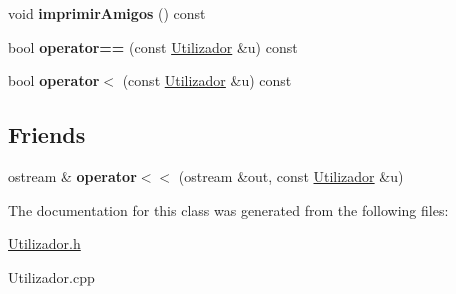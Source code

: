 \begin{DoxyCompactItemize}
\item 
\hypertarget{class_utilizador_a433c888d3d5d669cda5fcb8d22832b37}{}void {\bfseries imprimir\+Amigos} () const \label{class_utilizador_a433c888d3d5d669cda5fcb8d22832b37}

\item 
\hypertarget{class_utilizador_a051ebe3fbeadbb5b00a78da320a9f49e}{}bool {\bfseries operator==} (const \hyperlink{class_utilizador}{Utilizador} \&u) const \label{class_utilizador_a051ebe3fbeadbb5b00a78da320a9f49e}

\item 
\hypertarget{class_utilizador_a19b6202cece0cde531de23a1fd24b4c6}{}bool {\bfseries operator$<$} (const \hyperlink{class_utilizador}{Utilizador} \&u) const \label{class_utilizador_a19b6202cece0cde531de23a1fd24b4c6}

\end{DoxyCompactItemize}
\subsection*{Friends}
\begin{DoxyCompactItemize}
\item 
\hypertarget{class_utilizador_ad02a468bf3828d06a96b41947147c754}{}ostream \& {\bfseries operator$<$$<$} (ostream \&out, const \hyperlink{class_utilizador}{Utilizador} \&u)\label{class_utilizador_ad02a468bf3828d06a96b41947147c754}

\end{DoxyCompactItemize}


The documentation for this class was generated from the following files\+:\begin{DoxyCompactItemize}
\item 
\hyperlink{_utilizador_8h}{Utilizador.\+h}\item 
Utilizador.\+cpp\end{DoxyCompactItemize}
